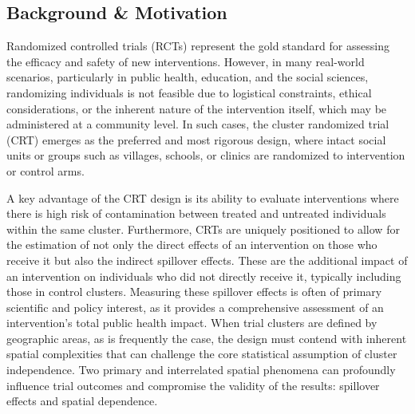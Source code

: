 \documentclass{article}[11pt]
\begin{document}

\subsection{Background \& Motivation}

Randomized controlled trials (RCTs) represent the gold standard for assessing the efficacy and safety of new interventions\cite{pocock_clinical_1983}\cite{smith_field_2015}. However, in many real-world scenarios, particularly in public health, education, and the social sciences, randomizing individuals is not feasible due to logistical constraints, ethical considerations, or the inherent nature of the intervention itself, which may be administered at a community level. In such cases, the cluster randomized trial (CRT) emerges as the preferred and most rigorous design, where intact social units or groups such as villages, schools, or clinics are randomized to intervention or control arms\cite{hayes_cluster_2017}\cite{donner_design_2000}.

A key advantage of the CRT design is its ability to evaluate interventions where there is high risk of contamination between treated and untreated individuals within the same cluster\cite{hayes_cluster_2017}\cite{hudgens_toward_2008}. Furthermore, CRTs are uniquely positioned to allow for the estimation of not only the direct effects of an intervention on those who receive it but also the indirect spillover effects. These are the additional impact of an intervention on individuals who did not directly receive it, typically including those in control clusters. Measuring these spillover effects is often of primary scientific and policy interest, as it provides a comprehensive assessment of an intervention's total public health impact\cite{hayes_cluster_2017}\cite{hayes_design_2000}. When trial clusters are defined by geographic areas, as is frequently the case, the design must contend with inherent spatial complexities that can challenge the core statistical assumption of cluster independence. Two primary and interrelated spatial phenomena can profoundly influence trial outcomes and compromise the validity of the results: spillover effects and spatial dependence\cite{hayes_cluster_2017}\cite{smith_field_2015}.
\end{document}
